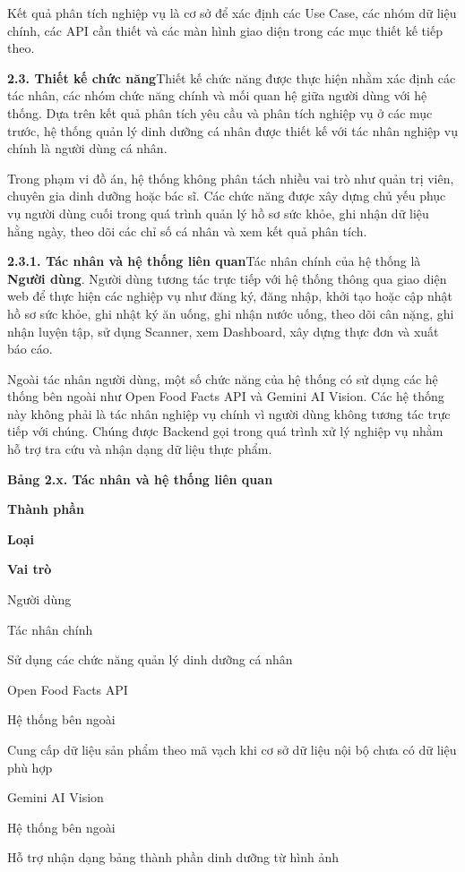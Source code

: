Kết quả phân tích nghiệp vụ là cơ sở để xác định các Use Case, các nhóm dữ liệu chính, các API cần thiết và các màn hình giao diện trong các mục thiết kế tiếp theo.

\textbf{2.3. Thiết kế chức năng}Thiết kế chức năng được thực hiện nhằm xác định các tác nhân, các nhóm chức năng chính và mối quan hệ giữa người dùng với hệ thống. Dựa trên kết quả phân tích yêu cầu và phân tích nghiệp vụ ở các mục trước, hệ thống quản lý dinh dưỡng cá nhân được thiết kế với tác nhân nghiệp vụ chính là người dùng cá nhân.

Trong phạm vi đồ án, hệ thống không phân tách nhiều vai trò như quản trị viên, chuyên gia dinh dưỡng hoặc bác sĩ. Các chức năng được xây dựng chủ yếu phục vụ người dùng cuối trong quá trình quản lý hồ sơ sức khỏe, ghi nhận dữ liệu hằng ngày, theo dõi các chỉ số cá nhân và xem kết quả phân tích.

\textbf{2.3.1. Tác nhân và hệ thống liên quan}Tác nhân chính của hệ thống là \textbf{Người dùng}. Người dùng tương tác trực tiếp với hệ thống thông qua giao diện web để thực hiện các nghiệp vụ như đăng ký, đăng nhập, khởi tạo hoặc cập nhật hồ sơ sức khỏe, ghi nhật ký ăn uống, ghi nhận nước uống, theo dõi cân nặng, ghi nhận luyện tập, sử dụng Scanner, xem Dashboard, xây dựng thực đơn và xuất báo cáo.

Ngoài tác nhân người dùng, một số chức năng của hệ thống có sử dụng các hệ thống bên ngoài như Open Food Facts API và Gemini AI Vision. Các hệ thống này không phải là tác nhân nghiệp vụ chính vì người dùng không tương tác trực tiếp với chúng. Chúng được Backend gọi trong quá trình xử lý nghiệp vụ nhằm hỗ trợ tra cứu và nhận dạng dữ liệu thực phẩm.

\textbf{Bảng 2.x. Tác nhân và hệ thống liên quan}

\textbf{Thành phần}

\textbf{Loại}

\textbf{Vai trò}

Người dùng

Tác nhân chính

Sử dụng các chức năng quản lý dinh dưỡng cá nhân

Open Food Facts API

Hệ thống bên ngoài

Cung cấp dữ liệu sản phẩm theo mã vạch khi cơ sở dữ liệu nội bộ chưa có dữ liệu phù hợp

Gemini AI Vision

Hệ thống bên ngoài

Hỗ trợ nhận dạng bảng thành phần dinh dưỡng từ hình ảnh

